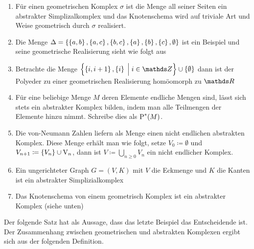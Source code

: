 \begin{Bsp}
  \begin{enumerate}[\textbullet]
  \item Für einen geometrischen Komplex $\sigma$ ist die Menge all
    seiner Seiten ein abstrakter Simplizalkomplex und das Knotenschema
    wird auf triviale Art und Weise geometrisch durch $\sigma$
    realisiert.
  \item Die Menge $\Delta = \sset{%
      \sset{a,b},\sset{a,c},%
      \sset{b,c},\sset{a},\sset{b},\sset{c},\emptyset}$ ist ein Beispiel und 
    seine geometrische Realisierung sieht wie folgt aus
    \begin{center}
    \end{center}

  \item Betrachte die Menge
    $\set{ \sset{i,i+1} , \sset{i} }{ i \in \Z} \cup \sset{\emptyset}$
    dann ist der Polyeder zu einer geometrischen Realisierung
    homöomorph zu $\R$

  \item Für eine beliebige Menge $M$ deren Elemente endliche Mengen
    sind, lässt sich stets ein abstrakter Komplex bilden, indem man
    alle Teilmengen der Elemente hinzu nimmt. Schreibe dies als
    $\operatorname{P}^*(M)$.

  \item Die von-Neumann Zahlen liefern als Menge einen nicht endlichen
    abstrakten Komplex.  Diese Menge erhält man wie folgt, setze
    $V_0 \coloneqq \emptyset$ und
    $V_{n+1} \coloneqq \left\{ V_n \right\} \cup \operatorname{V}_n$, dann ist 
    $V \coloneqq \bigcup\limits_{n \geq 0} V_n$ ein nicht endlicher Komplex.
  \item Ein ungerichteter Graph $G=(V,K)$ mit $V$ die Eckmenge und $K$
    die Kanten ist ein abstrakter Simplizialkomplex
  \item Das Knotenschema von einem geometrisch Komplex ist ein
    abstrakter Komplex (siehe unten)
  \end{enumerate}
\end{Bsp}

Der folgende Satz hat als Aussage, dass das letzte Beispiel das
Entscheidende ist. Der Zusammenhang zwischen geometrischen und
abstrakten Komplexen ergibt sich aus der folgenden Definition.


